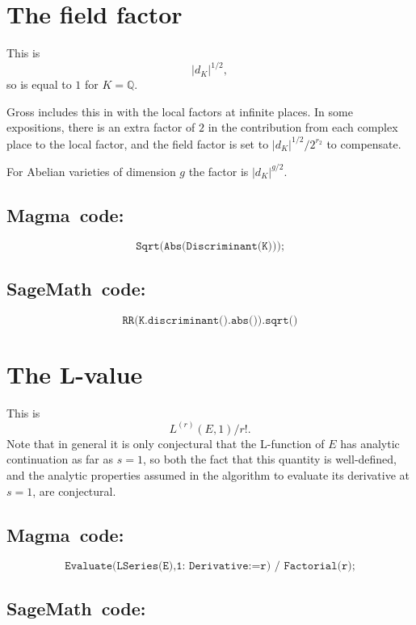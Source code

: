 \documentclass{amsart}
\newcommand{\software}[1]{\textsf{#1}} %
\newcommand{\Sage}{\software{SageMath}{}\ }
\newcommand{\Magma}{\software{Magma}{}\ }
\newcommand\Q{\mathbb{Q}}
\begin{document}
\section{The field factor}\label{field-factor}

This is \[|d_K|^{1/2},\] so is equal to \(1\) for \(K=\Q\).

Gross includes this in with the local factors at infinite places.  In
some expositions, there is an extra factor of $2$ in the contribution
from each complex place to the local factor, and the field factor is
set to \(|d_K|^{1/2}/2^{r_2}\) to compensate.

For Abelian varieties of dimension \(g\) the factor is
\(|d_K|^{g/2}\).

\subsection{\Magma code:}\label{magma-1}

\[
\texttt{Sqrt(Abs(Discriminant(K)));}
\]

\subsection{\Sage code:}\label{sage-1}

\[
\texttt{RR(K.discriminant().abs()).sqrt()}
\]

\section{The L-value}\label{the-l-value}

This is \[L^{(r)}(E,1)/r!.\] Note that in general it is only conjectural
that the L-function of \(E\) has analytic continuation as far as
\(s=1\), so both the fact that this quantity is well-defined, and the
analytic properties assumed in the algorithm to evaluate its derivative
at \(s=1\), are conjectural.

\subsection{\Magma code:}\label{magma-2}

\[
\texttt{Evaluate(LSeries(E),1:\ Derivative:=r)\ /\ Factorial(r);}
\]

\subsection{\Sage code:}\label{sage-2}
\end{document}
